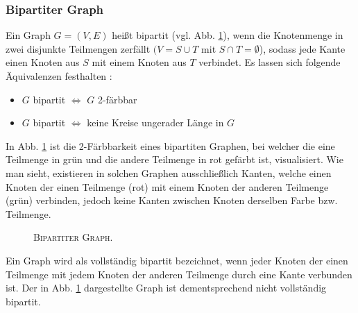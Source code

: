 \subsubsection{Bipartiter Graph}
\label{sec:digression_bipartite_graph}

Ein Graph $G = (V, E)$ heißt bipartit (vgl. Abb. \ref{fig:digression_bipartite_graph}), wenn die Knotenmenge in zwei disjunkte Teilmengen zerfällt
$(V = S \cup T$ mit $S \cap T = \emptyset$), sodass jede Kante einen Knoten aus $S$ mit einem Knoten aus $T$ verbindet. \cite{HochschuleDarmstadt}\newline
Es lassen sich folgende Äquivalenzen festhalten \cite{Leighton2010}:
\begin{itemize}
  \item $G$ bipartit $\iff$ $G$ 2-färbbar
  \item $G$ bipartit $\iff$ keine Kreise ungerader Länge in $G$
\end{itemize}
In Abb. \ref{fig:digression_bipartite_graph} ist die 2-Färbbarkeit eines bipartiten Graphen, bei welcher die eine Teilmenge
in grün und die andere Teilmenge in rot gefärbt ist, visualisiert. Wie man sieht, existieren in solchen Graphen
ausschließlich Kanten, welche einen Knoten der einen Teilmenge (rot) mit einem Knoten der anderen Teilmenge (grün) verbinden,
jedoch keine Kanten zwischen Knoten derselben Farbe bzw. Teilmenge.

\begin{figure}[H]
\centering
{}
\caption{\textsc{Bipartiter Graph.}}
\label{fig:digression_bipartite_graph}
\end{figure}

Ein Graph wird als vollständig bipartit bezeichnet, wenn jeder Knoten der einen Teilmenge mit jedem Knoten
der anderen Teilmenge durch eine Kante verbunden ist. Der in Abb. \ref{fig:digression_bipartite_graph}
dargestellte Graph ist dementsprechend nicht vollständig bipartit.

